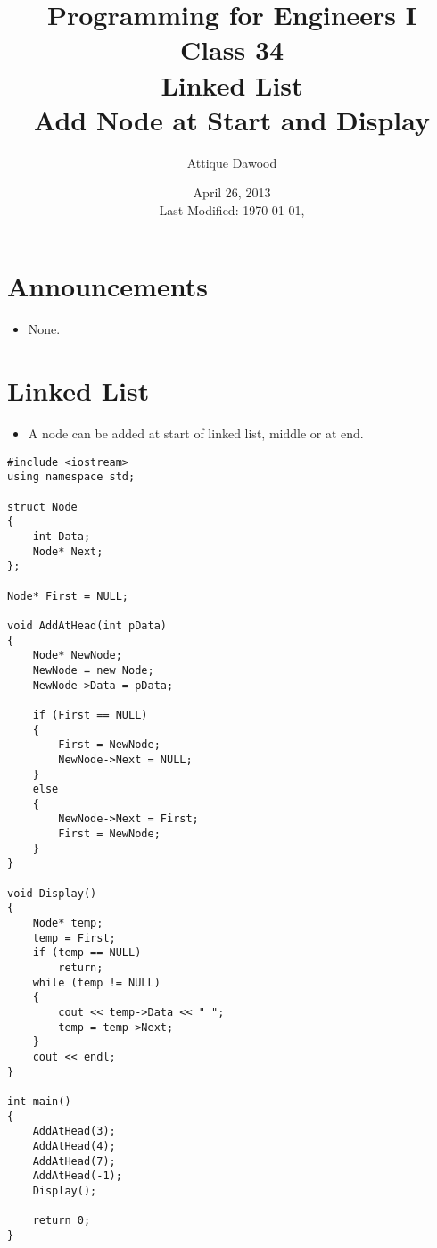 \documentclass[12pt,a4paper]{article}
\title{\vspace{-2cm}Programming for Engineers I\\Class 34\\Linked List\\Add Node at Start and Display}
\author{Attique Dawood}
\date{April 26, 2013\\[0.2cm] Last Modified: \today, \currenttime}
\begin{document}
\maketitle
\section{Announcements}
\begin{itemize}
\item None.
\end{itemize}
\section{Linked List}
\begin{itemize}
\item A node can be added at start of linked list, middle or at end.
\end{itemize}
\begin{lstlisting}[caption={Linked List: Add at Head and Display}]
#include <iostream>
using namespace std;

struct Node
{
	int Data;
	Node* Next;
};

Node* First = NULL;

void AddAtHead(int pData)
{
	Node* NewNode;
	NewNode = new Node;
	NewNode->Data = pData;

	if (First == NULL)
	{
		First = NewNode;
		NewNode->Next = NULL;
	}
	else
	{
		NewNode->Next = First;
		First = NewNode;
	}
}

void Display()
{
	Node* temp;
	temp = First;
	if (temp == NULL)
		return;
	while (temp != NULL)
	{
		cout << temp->Data << " ";
		temp = temp->Next;
	}
	cout << endl;
}

int main()
{
	AddAtHead(3);
	AddAtHead(4);
	AddAtHead(7);
	AddAtHead(-1);
	Display();
	
	return 0;
}
\end{lstlisting}
\end{document}
